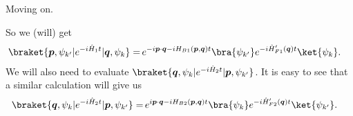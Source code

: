 \documentclass{report}
\begin{document}
Moving on.

So we (will) get 
\begin{align}
\begin{aligned}
	\braket{\boldsymbol{p}, \psi_{k'} | e^{-i \hat H_1 t} | \boldsymbol{q}, \psi_k} =&\,
		e^{-i \boldsymbol{p} \cdot \boldsymbol{q} - i H_{B1}(\boldsymbol{p}, \boldsymbol{q}) t} 
		\bra{\psi_{k'}}
			e^{-i \hat H_{F1}'(\boldsymbol{q}) t}
		\ket{\psi_k}.
\end{aligned}
\end{align}
We will also need to evaluate $\braket{\boldsymbol{q}, \psi_{k} | e^{-i \hat H_2 t} | \boldsymbol{p}, \psi_{k'}}$. It is easy to see that a similar calculation will give us
\begin{align}
\begin{aligned}
	\braket{\boldsymbol{q}, \psi_{k} | e^{-i \hat H_2 t} | \boldsymbol{p}, \psi_{k'}} =&\,
		e^{ i \boldsymbol{p} \cdot \boldsymbol{q} - i H_{B2}(\boldsymbol{p}, \boldsymbol{q}) t} 
		\bra{\psi_{k}}
			e^{-i \hat H_{F2}'(\boldsymbol{q}) t}
		\ket{\psi_{k'}}.
\end{aligned}
\end{align}
\end{document}
